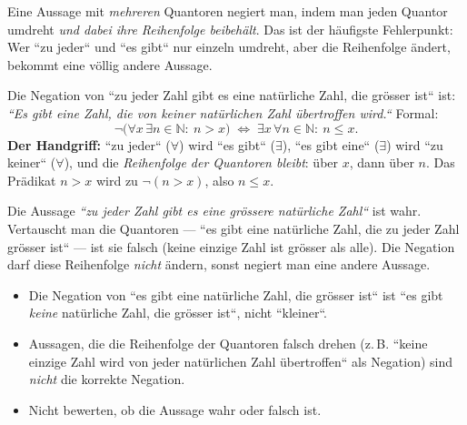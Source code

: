 


Eine Aussage mit \emph{mehreren} Quantoren negiert man, indem man jeden
Quantor umdreht \emph{und dabei ihre Reihenfolge beibehält}. Das ist der
häufigste Fehlerpunkt: Wer ``zu jeder`` und ``es gibt`` nur einzeln
umdreht, aber die Reihenfolge ändert, bekommt eine völlig andere Aussage.

\begin{werkzeugkasten}
Die Negation von ``zu jeder Zahl gibt es eine natürliche Zahl, die
grösser ist`` ist:
\emph{``Es gibt eine Zahl, die von keiner natürlichen Zahl übertroffen
wird.``}
Formal:
\begin{equation}
  \neg\bigl(\forall x\,\exists n\in\mathbb N:\ n>x\bigr)\;\Longleftrightarrow\;
  \exists x\,\forall n\in\mathbb N:\ n\leq x .
\end{equation}
\textbf{Der Handgriff:} ``zu jeder`` ($\forall$) wird ``es gibt``
($\exists$), ``es gibt eine`` ($\exists$) wird ``zu keiner`` ($\forall$),
und die \emph{Reihenfolge der Quantoren bleibt}: über $x$, dann über $n$.
Das Prädikat $n>x$ wird zu $\neg(n>x)$, also $n\le x$.
\end{werkzeugkasten}

\begin{werkzeugkasten}
Die Aussage \emph{``zu jeder Zahl gibt es eine grössere natürliche
Zahl``} ist wahr. Vertauscht man die Quantoren --- ``es gibt eine
natürliche Zahl, die zu jeder Zahl grösser ist`` --- ist sie falsch (keine
einzige Zahl ist grösser als alle). Die Negation darf diese Reihenfolge
\emph{nicht} ändern, sonst negiert man eine andere Aussage.
\end{werkzeugkasten}

\begin{achtung}
\begin{itemize}
  \item Die Negation von ``es gibt eine natürliche Zahl, die grösser
        ist`` ist ``es gibt \emph{keine} natürliche Zahl, die grösser
        ist``, nicht ``kleiner``.
  \item Aussagen, die die Reihenfolge der Quantoren falsch drehen (z.\,B.
        ``keine einzige Zahl wird von jeder natürlichen Zahl
        übertroffen`` als Negation) sind \emph{nicht} die korrekte
        Negation.
  \item Nicht bewerten, ob die Aussage wahr oder falsch ist.
\end{itemize}
\end{achtung}

